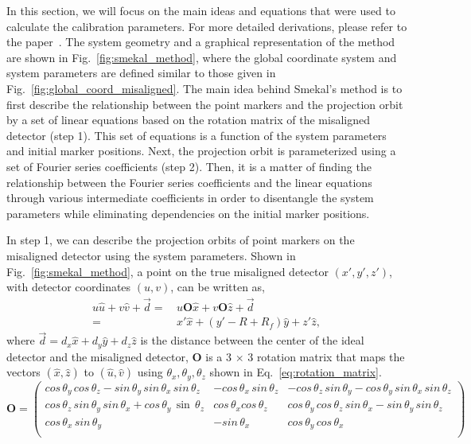 In this section, we will focus on the main ideas and equations that were used to calculate the calibration parameters.  For more detailed derivations, please refer to the paper~\citep{Smekal2004}.  The system geometry and a graphical representation of the method are shown in Fig.~\ref{fig:smekal_method}, where the global coordinate system and system parameters are defined similar to those given in Fig.~\ref{fig:global_coord_misaligned}. The main idea behind Smekal's method is to first describe the relationship between the point markers and the projection orbit by a set of linear equations based on the rotation matrix of the misaligned detector (step 1). This set of equations is a function of the system parameters and initial marker positions.  Next, the projection orbit is parameterized using a set of Fourier series coefficients (step 2).  Then, it is a matter of finding the relationship between the Fourier series coefficients and the linear equations through various intermediate coefficients in order to disentangle the system parameters while eliminating dependencies on the initial marker positions.

In step 1, we can describe the projection orbits of point markers on the misaligned detector using the system parameters.  Shown in Fig.~\ref{fig:smekal_method}, a point on the true misaligned detector $(x', y', z')$, with detector coordinates $(u, v)$, can be written as,
%
\begin{equation}
\begin{aligned}
u \hat{u} + v \hat{v} + \vec{d} =& \, u \mathrm{\mathbf{O}} \hat{x} + v \mathrm{\mathbf{O}} \hat{z} + \vec{d} \\
								=& \, x' \hat{x} + (y' - R + R_f) \hat{y} + z' \hat{z},
\end{aligned}
\label{eq:projection_orbit}
\end{equation}
%
where $\vec{d} = d_x \hat{x} + d_y \hat{y} + d_z \hat{z}$ is the distance between the center of the ideal detector and the misaligned detector, $\mathrm{\mathbf{O}}$ is a 3 $\times$ 3 rotation matrix that maps the vectors $(\hat{x}, \hat{z})$ to $(\hat{u}, \hat{v})$ using $\theta_x, \theta_y, \theta_z$ shown in Eq.~\ref{eq:rotation_matrix}.
%
\begin{equation}
\mathrm{\mathbf{O}} = 
\begin{pmatrix}
cos\, \theta_y \, cos \,\theta_z - sin \, \theta_y \, sin \, \theta_x \, sin \, \theta_z & -cos \, \theta_x \, sin \, \theta_z & -cos \, \theta_z \, sin \, \theta_y - cos \, \theta_y \, sin \, \theta_x \, sin \, \theta_z \\
cos \, \theta_z \, sin \, \theta_y \, sin \, \theta_x + cos \, \theta_y \, \sin \, \theta_z & cos \, \theta_x cos \, \theta_z & cos \, \theta_y \, cos \, \theta_z \, sin \, \theta_x - sin \, \theta_y \, sin \, \theta_z \\
cos \, \theta_x \, sin \, \theta_y & -sin \, \theta_x & cos \, \theta_y \, cos \, \theta_x \\
\end{pmatrix}
\label{eq:rotation_matrix}
\end{equation}

